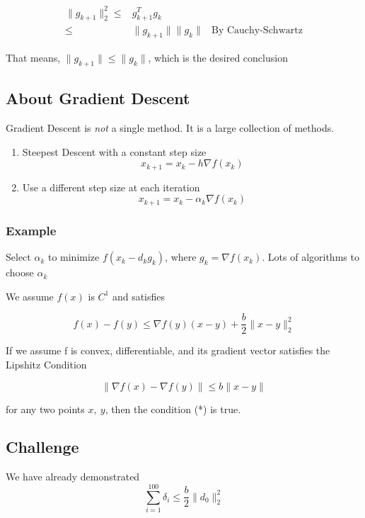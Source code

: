 \documentclass[11pt]{article}
\begin{document}
\begin{subequations}
\label{first:main}
\begin{align}
\|g_{k + 1}\|_2^2 \leq & g_{k + 1}^T g_k\\
\leq & \|g_{k + 1}\| \|g_k\| & \text{By Cauchy-Schwartz}
\end{align}
\end{subequations}


That means, \(\|g_{k+1}\| \leq \|g_k\|\), which is the desired conclusion


\subsection{About Gradient Descent}
\label{sec:orgf4b28e2}

Gradient Descent is \emph{not} a single method. It is a large collection of methods.

\begin{enumerate}
\item Steepest Descent with a constant step size
$$x_{k + 1} = x_k - h \nabla f(x_k)$$

\item Use a different step size at each iteration
$$x_{k + 1} = x_k - \alpha_k \nabla f(x_k)$$
\end{enumerate}


\subsubsection{Example}
\label{sec:org0c451f9}

Select \(\alpha_k\) to minimize \(f(x_k - d_k g_k)\), where \(g_k = \nabla f(x_k)\).
Lots of algorithms to choose \(\alpha_k\)

We assume \(f(x)\) is \(C^1\) and satisfies

$$
f(x) - f(y) \leq \nabla f(y)(x - y) + \frac{b}{2} \|x - y\|_2^2
$$

If we assume f is convex, differentiable, and its gradient vector satisfies the
Lipshitz Condition

$$
\|\nabla f(x) - \nabla f(y)\| \leq b \|x - y\|
$$

for any two points \(x, \ y\), then the condition (*) is true.

\subsection{Challenge}
\label{sec:org53e5092}
We have already demonstrated
$$
\sum_{i = 1}^{100} \delta_i \leq \frac{b}{2} \|d_0\|_2^2
$$
\end{document}
